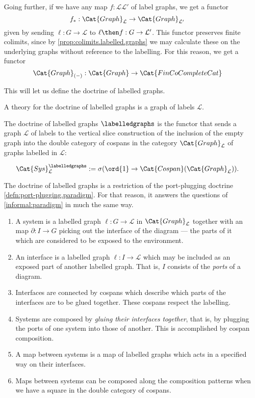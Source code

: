 \documentclass[DynamicalBook]{subfiles}
\begin{document}
  Going further, if we have any map $f : \mathcal{L} \mathcal{L}'$ of label graphs, we get a functor
  $$f_{\ast} : \Cat{Graph}_{\mathcal{L}} \to \Cat{Graph}_{\mathcal{L}'}$$
  given by sending $\ell : G \to \mathcal{L}$ to $\ell \then f : G \to \mathcal{L}'$. This functor preserves finite colimits, since by \cref{prop:colimits.labelled.graphs} we may calculate these on the underlying graphs without reference to the labelling. For this reason, we get a functor
  \[
    \Cat{Graph}_{(-)} : \Cat{Graph} \to \Cat{FinCoCompleteCat}
  \]

  This will let us define the doctrine of labelled graphs.

  \begin{definition}\label{defn:paradigm.labelled.graphs}
    A theory for the doctrine of labelled graphs is a graph of labels $\mathcal{L}$.

    The doctrine of labelled graphs $\labelledgraphs$ is the functor that sends a graph $\mathcal{L}$ of labels to the vertical slice construction of the inclusion of the empty graph into the double category of cospans in the category $\Cat{Graph}_{\mathcal{L}}$ of graphs labelled in $\mathcal{L}$:

    \[
\Cat{Sys}^{\labelledgraphs}_{{\mathcal{L}}} := \sigma(\ord{1} \to \Cat{Cospan}(\Cat{Graph}_{\mathcal{L}})).
  \]
  \end{definition}

The doctrine of labelled graphs is a restriction of the port-plugging doctrine \cref{defn:port-plugging.paradigm}. For that reason, it answers the questions of \cref{informal:paradigm} in much the same way.
  \begin{enumerate}
          \item A system is a labelled graph $\ell : G \to \mathcal{L}$ in $\Cat{Graph}_{\mathcal{L}}$ together with an map $\partial : I \to G$ picking out the interface of the diagram --- the parts of it which are considered to be exposed to the environment.
          \item An interface is a labelled graph $ \ell : I \to \mathcal{L} $ which may be included as an exposed part of another labelled graph. That is, $I$ consists of the \emph{ports} of a diagram.
          \item Interfaces are connected by cospans which describe which parts of the interfaces are to be glued together. These cospans respect the labelling.
          \item Systems are composed by \emph{gluing their interfaces together}, that is, by plugging the ports of one system into those of another. This is accomplished by cospan composition.
          \item A map between systems is a map of labelled graphs which acts in a specified way on their interfaces.
          \item Maps between systems can be composed along the composition patterns when we have a square in the double category of cospans.
  \end{enumerate}
\end{document}
